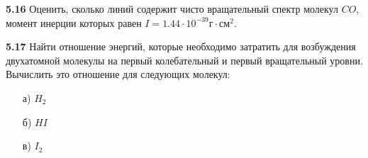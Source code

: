 	\textbf{5.16 }
		Оценить, сколько линий содержит чисто вращательный спектр молекул
		\( CO \), момент инерции которых равен 
		\( I = 1.44\cdot10^{-39} \text{г}\cdot\text{см}^2 \).

	\textbf{5.17 }
		Найти отношение энергий, которые необходимо затратить для
		возбуждения двухатомной молекулы на первый колебательный и первый
		вращательный уровни. Вычислить это отношение для следующих молекул:
		\vspace*{-1em} 
		\begin{itemize}\itemsep-8pt
			\item[а)] \( H_2 \)
			\item[б)] \( HI \)
			\item[в)] \( I_2 \)
		\end{itemize}
